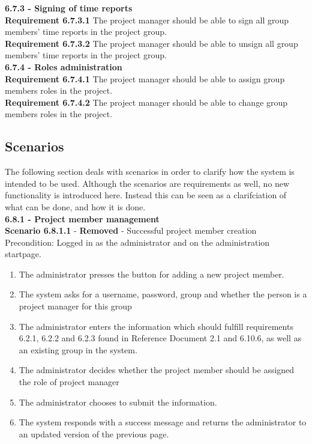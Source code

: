 \documentclass{article}
\begin{document}
{\fontsize{11}{11}\selectfont \noindent\textbf{6.7.3 - Signing of time reports}} \\
\textbf{Requirement 6.7.3.1} The project manager should be able to sign all group members' time reports in the project group.\\
\textbf{Requirement 6.7.3.2} The project manager should be able to unsign all group members' time reports in the project group.\\

{\fontsize{11}{11}\selectfont \noindent\textbf{6.7.4 - Roles administration}} \\
\textbf{Requirement 6.7.4.1} The project manager should be able to assign group members roles in the project.\\
\textbf{Requirement 6.7.4.2} The project manager should be able to change group members roles in the project.\\


\subsection{Scenarios}
The following section deals with scenarios in order to clarify how the system is intended to be used. Although the scenarios are requirements as well, no new functionality is introduced here. Instead this can be seen as a clarifciation of what can be done, and how it is done.\\

\noindent
{\fontsize{11}{11}\selectfont \noindent\textbf{6.8.1 - Project member management}} \\
\noindent\textbf{Scenario 6.8.1.1} - \textbf{Removed} - Successful project member creation  \\
Precondition: Logged in as the administrator and on the administration startpage.
\begin{enumerate}
\item The administrator presses the button for adding a new project member.
\item The system asks for a username, password, group and whether the person is a project manager for this group
\item The administrator enters the information which should fulfill requirements 6.2.1, 6.2.2 and 6.2.3 found in Reference Document 2.1 and 6.10.6, as well as an existing group in the system.
\item The administrator decides whether the project member should be assigned the role of project manager
\item The administrator chooses to submit the information.
\item The system responds with a success message and returns the administrator to an updated version of the previous page.
\end{enumerate}
\end{document}
